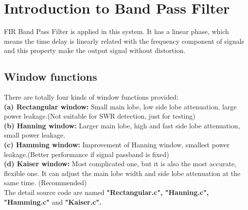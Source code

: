 \documentclass[12pt]{report}
\begin{document}
\section{\large Introduction to Band Pass Filter}
\textup{FIR Band Pass Filter is applied in this system. It has a linear phase, which means the time delay is linearly related with the frequency component of signals and this property make the output signal without distortion.}
\subsection{Window functions}
\textup{There are totally four kinds of window functions provided:\\}
\textbf{(a) Rectangular window:}
\textup{Small main lobe, low side lobe attenuation, large power leakage.(Not suitable for SWR detection, just for testing)\\ }
\textbf{(b) Hanning window:}
\textup{Larger main lobe, high and fast side lobe attenuation, small power leakage.\\ }
\textbf{(c) Hamming window:}
\textup{Improvement of Hanning window, smallest power leakage.(Better performance if signal passband is fixed)\\}
\textbf{(d) Kaiser window:}
\textup{Most complicated one, but it is also the most accurate, flexible  one. It can adjust the main lobe width and side lobe attenuation at the same time. (Recommended)\\}
The detail source code are named \textbf{"Rectangular.c", "Hanning.c", "Hamming.c"} and \textbf{"Kaiser.c".}
\end{document}
